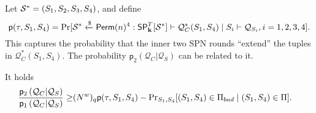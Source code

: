 Let
$\mathcal{S}^*=(S_1,S_2,S_3,S_4)$, and define     {\small
	$$\textsf{p}(\tau,S_1,S_4)=\Pr[\mathcal{S}^*\xleftarrow{\$}\mathsf{Perm}(n)^4:\mathsf{SP}_{\mathbf{k}}^T[\mathcal{S}^*]\vdash\mathcal{Q}_C^*(S_1,S_4)
	\mid S_i\vdash\mathcal{Q}_{S_i},i=1,2,3,4].$$
}%
This captures the probability that the inner two SPN rounds ``extend'' the tuples in $\mathcal{Q}_C^*(S_1,S_4)$. The probability
$\mathsf{p}_{2}\left(\mathcal{Q}_{C} | \mathcal{Q}_{S}\right)$ can be related to it.

\begin{lemma}
	\label{lemma:reduce-to-two-rounds}
	
	It holds
	\begin{align}
	\frac{\mathsf{p}_{2}\left(\mathcal{Q}_{C} | \mathcal{Q}_{S}\right)}{\mathsf{p}_{1}\left(\mathcal{Q}_{C} | \mathcal{Q}_{S}\right)}
	\geq  &  (N^w)_q{\mathsf{p}(\tau,S_1,S_4)}  - \operatorname{Pr}_{S_1,S_4}[(S_1,S_4) \in \emph{$\Pi_{bad}$}\mid (S_{1}, S_{4})\in\Pi].
	\label{eq:function-dependent-bound-on-ratio}
	\end{align}
%	
%	
%	
%	
%	
%	
\end{lemma}
